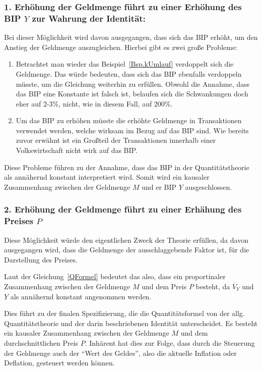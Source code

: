 \subsubsection*{1. Erhöhung der Geldmenge führt zu einer Erhöhung des BIP $Y$ zur Wahrung der Identität:}
Bei dieser Möglichkeit wird davon ausgegangen, dass sich das BIP erhöht, um den Anstieg der Geldmenge auszugleichen. Hierbei gibt es zwei große Probleme:

\begin{enumerate}
    \item Betrachtet man wieder das Beispiel\, \vref*{Bsp.kUmlauf} verdoppelt sich die Geldmenge. Das würde bedeuten, dass sich das BIP ebenfalls verdoppeln müsste, um die Gleichung weiterhin zu erfüllen. Obwohl die Annahme, dass das BIP eine Konstante ist falsch ist, belaufen sich die Schwankungen doch eher auf 2-3\%, nicht, wie in diesem Fall, auf 200\%.
    \item Um das BIP zu erhöhen müsste die erhöhte Geldmenge in Transaktionen verwendet werden, welche wirksam im Bezug auf das BIP sind. Wie bereits zuvor erwähnt ist ein Großteil der Transaktionen innerhalb einer Volkswirtschaft nicht wirk auf das BIP.
\end{enumerate}

Diese Probleme führen zu der Annahme, dass das BIP in der Quantitätstheorie als annähernd konstant interpretiert wird. Somit wird ein kausaler Zusammenhang zwischen der Geldmenge $M$ und er BIP $Y$ ausgeschlossen.

\subsubsection*{2. Erhöhung der Geldmenge führt zu einer Erhähung des Preises $P$}
Diese Möglichkeit würde den eigentlichen Zweck der Theorie erfüllen, da davon ausgegangen wird, dass die Geldmenge der ausschlaggebende Faktor ist, für die Darstellung des Preises.

Laut der Gleichung\, \vref*{QFormel} bedeutet das also, dass ein proportinaler Zusammenhang zwischen der Geldmenge $M$ und dem Preis $P$ besteht, da $\overline{V}_Y$ und $Y$ als annähernd konstant angenommen werden.

Dies führt zu der finalen Spezifizierung, die die Quantitätsformel von der allg. Quantitätstheorie und der darin beschriebenen Identität unterscheidet. Es besteht ein kausaler Zusammenhang zwischen der Geldmenge $M$ und dem durchschnittlichen Preis $P$.
Inhärent hat dies zur Folge, dass durch die Steuerung der Geldmenge auch der \enquote{Wert des Geldes}, also die aktuelle Inflation oder Deflation, gesteuert werden können.

